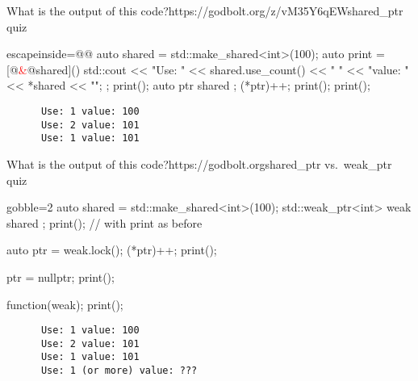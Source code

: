 \begin{frame}[fragile]
  \begin{exampleblockGB}{What is the output of this code?}{https://godbolt.org/z/vM35Y6qEW}{shared\_ptr quiz}
    \small
    \begin{cppcode*}{escapeinside=@@}
auto shared = std::make_shared<int>(100);
auto print = [@\textcolor{red}{&}@shared](){
  std::cout << "Use: " << shared.use_count() << " "
            << "value: " << *shared << "\n";
};
print();
{
  auto ptr{ shared };
  (*ptr)++;
  print();
}
print();
      \end{cppcode*}
  \end{exampleblockGB}
  \begin{block}{}
    \small
    \begin{verbatim}
      Use: 1 value: 100
      Use: 2 value: 101
      Use: 1 value: 101
    \end{verbatim}
  \end{block}
\end{frame}

\begin{advanced}

\begin{frame}[fragile]
  \begin{exampleblockGB}{What is the output of this code?}{https://godbolt.org}{shared\_ptr vs.\ weak\_ptr quiz}
    \small
    \begin{cppcode*}{gobble=2}
      auto shared = std::make_shared<int>(100);
      std::weak_ptr<int> weak{ shared };
      print(); // with print as before

      auto ptr = weak.lock();
      (*ptr)++;       print();

      ptr = nullptr;  print();

      function(weak); print();
    \end{cppcode*}
  \end{exampleblockGB}
  \pause
  \begin{block}{}
    \small
    \begin{verbatim}
      Use: 1 value: 100
      Use: 2 value: 101
      Use: 1 value: 101
      Use: 1 (or more) value: ???
    \end{verbatim}
  \end{block}
\end{frame}

\end{advanced}

